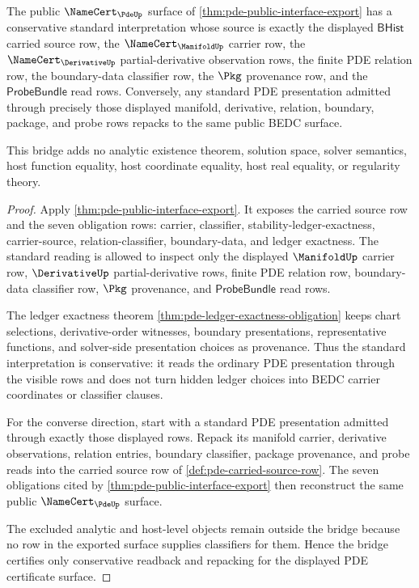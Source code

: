 \begin{theorem}
\label{thm:pde-conservative-standard-bridge}
The public $\NameCert_{\PdeUp}$ surface of \autoref{thm:pde-public-interface-export} has a conservative standard interpretation whose source is exactly the displayed $\mathsf{BHist}$ carried source row, the $\NameCert_{\ManifoldUp}$ carrier row, the $\NameCert_{\DerivativeUp}$ partial-derivative observation rows, the finite PDE relation row, the boundary-data classifier row, the $\Pkg$ provenance row, and the $\mathsf{ProbeBundle}$ read rows. Conversely, any standard PDE presentation admitted through precisely those displayed manifold, derivative, relation, boundary, package, and probe rows repacks to the same public BEDC surface.

This bridge adds no analytic existence theorem, solution space, solver semantics, host function equality, host coordinate equality, host real equality, or regularity theory.
\end{theorem}
\begin{proof}
Apply \autoref{thm:pde-public-interface-export}. It exposes the carried source row and the seven obligation rows: carrier, classifier, stability-ledger-exactness, carrier-source, relation-classifier, boundary-data, and ledger exactness. The standard reading is allowed to inspect only the displayed $\ManifoldUp$ carrier row, $\DerivativeUp$ partial-derivative rows, finite PDE relation row, boundary-data classifier row, $\Pkg$ provenance, and $\mathsf{ProbeBundle}$ read rows.

The ledger exactness theorem \autoref{thm:pde-ledger-exactness-obligation} keeps chart selections, derivative-order witnesses, boundary presentations, representative functions, and solver-side presentation choices as provenance. Thus the standard interpretation is conservative: it reads the ordinary PDE presentation through the visible rows and does not turn hidden ledger choices into BEDC carrier coordinates or classifier clauses.

For the converse direction, start with a standard PDE presentation admitted through exactly those displayed rows. Repack its manifold carrier, derivative observations, relation entries, boundary classifier, package provenance, and probe reads into the carried source row of \autoref{def:pde-carried-source-row}. The seven obligations cited by \autoref{thm:pde-public-interface-export} then reconstruct the same public $\NameCert_{\PdeUp}$ surface.

The excluded analytic and host-level objects remain outside the bridge because no row in the exported surface supplies classifiers for them. Hence the bridge certifies only conservative readback and repacking for the displayed PDE certificate surface.
\end{proof}

